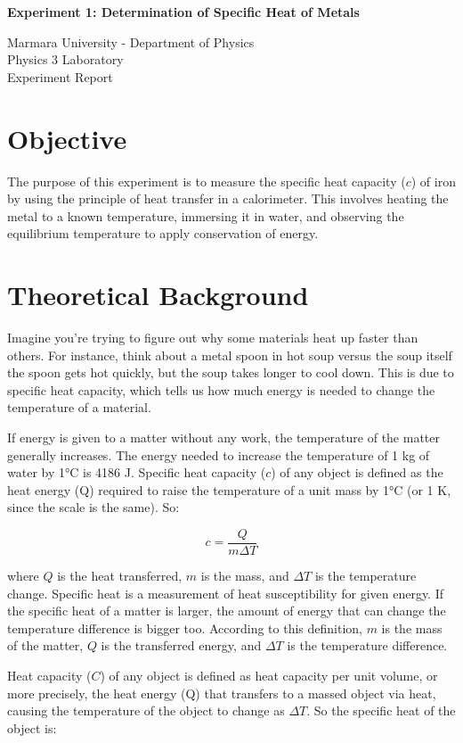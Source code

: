 \documentclass[12pt, a4paper]{article}
\begin{document}
\begin{center}
	\Large \textbf{Experiment 1: Determination of Specific Heat of Metals}
	\vspace{0.5cm}
	
	\normalsize Marmara University - Department of Physics \\
	Physics 3 Laboratory \\
	Experiment Report
	\vspace{0.5cm}
\end{center}

\section{Objective}
The purpose of this experiment is to measure the specific heat capacity ($c$) of iron by using the principle of heat transfer in a calorimeter. This involves heating the metal to a known temperature, immersing it in water, and observing the equilibrium temperature to apply conservation of energy.

\section{Theoretical Background}
Imagine you're trying to figure out why some materials heat up faster than others. For instance, think about a metal spoon in hot soup versus the soup itself the spoon gets hot quickly, but the soup takes longer to cool down. This is due to specific heat capacity, which tells us how much energy is needed to change the temperature of a material.

If energy is given to a matter without any work, the temperature of the matter generally increases. The energy needed to increase the temperature of 1 kg of water by 1°C is 4186 J. Specific heat capacity ($c$) of any object is defined as the heat energy (Q) required to raise the temperature of a unit mass by 1°C (or 1 K, since the scale is the same). So:

\[ c = \frac{Q}{m \Delta T} \]

where $Q$ is the heat transferred, $m$ is the mass, and $\Delta T$ is the temperature change. Specific heat is a measurement of heat susceptibility for given energy. If the specific heat of a matter is larger, the amount of energy that can change the temperature difference is bigger too. According to this definition, $m$ is the mass of the matter, $Q$ is the transferred energy, and $\Delta T$ is the temperature difference.

Heat capacity ($C$) of any object is defined as heat capacity per unit volume, or more precisely, the heat energy (Q) that transfers to a massed object via heat, causing the temperature of the object to change as $\Delta T$. So the specific heat of the object is:
\end{document}
